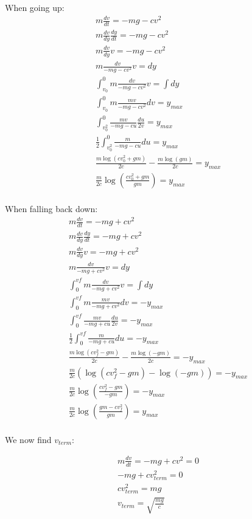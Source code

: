 \documentclass[10pt]{article} %
\begin{document}
When going up:\\
\begin{align}
  m\frac{dv}{dt} = -mg - cv^2\\
  m\frac{dv}{dy}\frac{dy}{dt} = -mg - cv^2\\
  m\frac{dv}{dy}v = -mg - cv^2\\
  m\frac{dv}{-mg - cv^2}v = dy\\
  \int_{v_0}^0 m\frac{dv}{-mg - cv^2}v = \int dy\\
  \int_{v_0}^0 m\frac{mv}{-mg - cv^2}dv = y_{max}\\
  \int_{v_0^2}^0 \frac{mv}{-mg - cu}\frac{du}{2v} = y_{max}\\
  \frac{1}{2} \int_{v_0^2}^0 \frac{m}{-mg - cu} du = y_{max}\\
  \frac{m \log(cv_0^2 + gm)}{2c} - \frac{m \log(gm)}{2c} = y_{max}\\
  \frac{m}{2c} \log(\frac{cv_0^2 + gm}{gm}) = y_{max}\\  
\end{align}

When falling back down:\\
\begin{align}
  m\frac{dv}{dt} = -mg + cv^2\\
  m\frac{dv}{dy}\frac{dy}{dt} = -mg + cv^2\\
  m\frac{dv}{dy}v = -mg + cv^2\\
  m\frac{dv}{-mg + cv^2}v = dy\\
  \int_{0}^{vf} m\frac{dv}{-mg + cv^2}v = \int dy\\
  \int_{0}^{vf} m\frac{mv}{-mg + cv^2}dv = -y_{max}\\
  \int_{0}^{vf} \frac{mv}{-mg + cu}\frac{du}{2v} = -y_{max}\\
  \frac{1}{2} \int_{0}^{vf} \frac{m}{-mg + cu} du = -y_{max}\\
  \frac{m \log(cv_f^2 - gm)}{2c} - \frac{m \log(-gm)}{2c} = -y_{max}\\
  \frac{m}{2c} (\log(cv_f^2 - gm) - \log(-gm)) = -y_{max}\\
  \frac{m}{2c} \log(\frac{cv_f^2 - gm}{-gm}) = -y_{max}\\
  \frac{m}{2c} \log(\frac{gm - cv_f^2}{gm}) = y_{max}\\
\end{align}

We now find $v_{term}$:

\begin{align}
  m\frac{dv}{dt} = -mg + cv^2 = 0\\
  -mg + cv_{term}^2 = 0\\
  cv_{term}^2 = mg\\
  v_{term} = \sqrt{\frac{mg}{c}}\\
\end{align}
\end{document}
